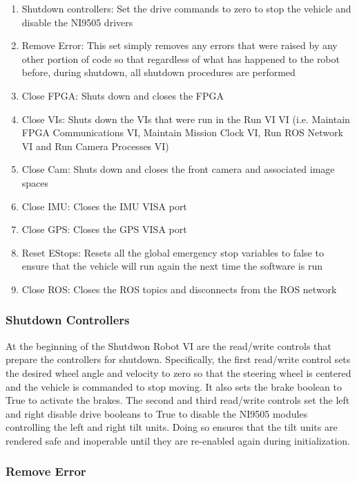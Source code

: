 \begin{enumerate}
\item Shutdown controllers: Set the drive commands to zero to stop the vehicle and disable the NI9505 drivers
\item Remove Error: This set simply removes any errors that were raised by any other portion of code so that regardless of what has happened to the robot before, during shutdown, all shutdown procedures are performed
\item Close FPGA: Shuts down and closes the FPGA
\item Close VIs: Shuts down the VIs that were run in the Run VI VI (i.e. Maintain FPGA Communications VI, Maintain Mission Clock VI, Run ROS Network VI and Run Camera Processes VI)
\item Close Cam: Shuts down and closes the front camera and associated image spaces
\item Close IMU: Closes the IMU VISA port
\item Close GPS: Closes the GPS VISA port
\item Reset EStops: Resets all the global emergency stop variables to false to ensure that the vehicle will run again the next time the software is run
\item Close ROS: Closes the ROS topics and disconnects from the ROS network
\end{enumerate}

\subsubsection{Shutdown Controllers}

At the beginning of the Shutdwon Robot VI are the read/write controls that prepare the controllers for shutdown. Specifically, the first read/write control sets the desired wheel angle and velocity to zero so that the steering wheel is centered and the vehicle is commanded to stop moving. It also sets the brake boolean to True to activate the brakes. The second and third read/write controls set the left and right disable drive booleans to True to disable the NI9505 modules controlling the left and right tilt units. Doing so ensures that the tilt units are rendered safe and inoperable until they are re-enabled again during initialization.

\subsubsection{Remove Error}


